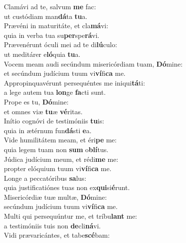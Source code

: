 \evenverse Clamávi ad te, salvum \textbf{me} fac:~\*\\
\evenverse ut custódiam man\textbf{dá}ta \textbf{tu}a.\\
\oddverse Prævéni in maturitáte, et cla\textbf{má}vi:~\*\\
\oddverse quia in verba tua su\textbf{per}spe\textbf{rá}vi.\\
\evenverse Prævenérunt óculi mei ad te di\textbf{lú}culo:~\*\\
\evenverse ut meditárer e\textbf{ló}quia \textbf{tu}a.\\
\oddverse Vocem meam audi secúndum misericórdiam tuam, \textbf{Dó}mine:~\*\\
\oddverse et secúndum judícium tuum vi\textbf{ví}fi\textbf{ca} me.\\
\evenverse Appropinquavérunt persequéntes me iniqui\textbf{tá}ti:~\*\\
\evenverse a lege autem tua \textbf{lon}ge \textbf{fa}cti sunt.\\
\oddverse Prope es tu, \textbf{Dó}mine:~\*\\
\oddverse et omnes viæ \textbf{tu}æ \textbf{vé}ritas.\\
\evenverse Inítio cognóvi de testimóniis \textbf{tu}is:~\*\\
\evenverse quia in ætérnum fun\textbf{dá}sti \textbf{e}a.\\
\oddverse Vide humilitátem meam, et éri\textbf{pe} me:~\*\\
\oddverse quia legem tuam non \textbf{sum} o\textbf{blí}tus.\\
\evenverse Júdica judícium meum, et rédi\textbf{me} me:~\*\\
\evenverse propter elóquium tuum vi\textbf{ví}fi\textbf{ca} me.\\
\oddverse Longe a peccatóribus \textbf{sa}lus:~\*\\
\oddverse quia justificatiónes tuas non ex\textbf{qui}si\textbf{é}runt.\\
\evenverse Misericórdiæ tuæ multæ, \textbf{Dó}mine:~\*\\
\evenverse secúndum judícium tuum vi\textbf{ví}fi\textbf{ca} me.\\
\oddverse Multi qui persequúntur me, et tríbu\textbf{lant} me:~\*\\
\oddverse a testimóniis tuis non \textbf{de}cli\textbf{ná}vi.\\
\evenverse Vidi prævaricántes, et tabe\textbf{scé}bam:~\*\\
